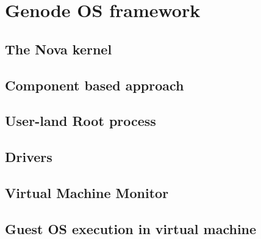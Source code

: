 \addchapheadtotoc
\chapter{Genode OS framework}
\section{The Nova kernel}
\section{Component based approach}
\section{User-land Root process}
\section{Drivers}
\section{Virtual Machine Monitor}
\section{Guest OS execution in virtual machine}
